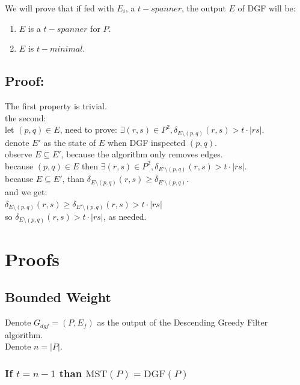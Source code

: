 \documentclass{article}
\begin{document}
We will prove that if fed with $E_i$, a $t-spanner$, the output $E$ of DGF will be:
\begin{enumerate}
    \item $E$ is a $t-spanner$ for $P$.
    \item $E$ is $t-minimal$.
\end{enumerate}

\subsection{Proof:}

The first property is trivial.\\
the second:\\
let $(p,q) \in E$, need to prove: $\exists (r, s) \in P^2, \delta_{E \setminus (p,q)}(r,s) > t \cdot |r s|$.\\
denote $E'$ as the state of $E$ when DGF inspected $(p,q)$.\\
observe $E \subseteq E'$, because the algorithm only removes edges.\\
because $(p,q) \in E$ then  $\exists (r, s) \in P^2, \delta_{E' \setminus (p,q)}(r,s) > t \cdot |r s|$.\\
because $E \subseteq E'$, than  $ \delta_{E \setminus (p,q)}(r,s) \geq \delta_{E' \setminus (p,q)}$.\\
and we get:\\
$\delta_{E \setminus (p,q)}(r,s) \geq \delta_{E' \setminus (p,q)}(r,s) > t \cdot |r s|$\\
so $\delta_{E \setminus (p,q)}(r,s) > t \cdot |r s|$, as needed.\\

\section{Proofs}


\subsection{Bounded Weight}

Denote $G_{dgf} = (P, E_f)$ as the output of the Descending Greedy Filter algorithm. \\
Denote $n = |P|$.

\subsubsection{If $t=n-1$ than $\text{MST}(P) = \text{DGF}(P)$}
\end{document}
